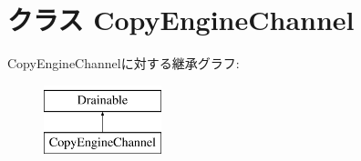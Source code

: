 \hypertarget{classCopyEngine_1_1CopyEngineChannel}{
\section{クラス CopyEngineChannel}
\label{classCopyEngine_1_1CopyEngineChannel}
}
CopyEngineChannelに対する継承グラフ:\begin{figure}[H]
\begin{center}
\leavevmode
\includegraphics[height=2cm]{classCopyEngine_1_1CopyEngineChannel}
\end{center}
\end{figure}

